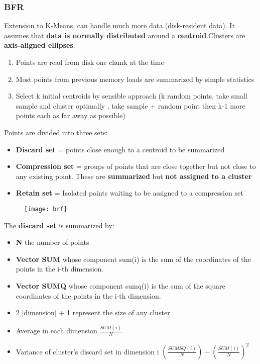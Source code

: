 \subsubsection{BFR}
Extension to K-Means, can handle much more data (disk-resident data). It assumes that \textbf{data is normally distributed} around a \textbf{centroid}.Clusters are \textbf{axis-aligned ellipses}.\\
\begin{enumerate}
\item Points are read from disk one chunk at the time
\item Most points from previous memory loads are summarized by simple statistics
\item Select k initial centroids by sensible approach (k random points, take small sample and cluster optimally , take sample + random point then k-1 more points each as far away as possible)
\end{enumerate}
Points are divided into three sets: 
\begin{itemize}
\item \textbf{Discard set} = points close enough to a centroid to be summarized
\item \textbf{Compression set} = groups of points that are close together but not close to any existing point. These are \textbf{summarized} but \textbf{not assigned to a cluster}
\item \textbf{Retain set} = Isolated points waiting to be assigned to a compression set
\end{itemize}
\begin{figure}[H]
  \centering
  \texttt{[image: brf]}
\end{figure}
The \textbf{discard set } is summarized by:
\begin{itemize}
\item \textbf{N} the number of points
\item \textbf{Vector SUM} whose component sum(i) is the sum of the coordinates of the points in the i-th dimension.
\item \textbf{Vector SUMQ} whose component sumq(i) is the sum of the square coordinates of the points in the i-th dimension.
\item 2 |dimension| + 1 represent the size of any cluster
\item Average in each dimension $\frac{SUM(i)}{N}$
\item Variance of cluster's discard set in dimension i $(\frac{SUMSQ(i)}{N})-(\frac{SUM(i)}{N})^2$
\end{itemize}

